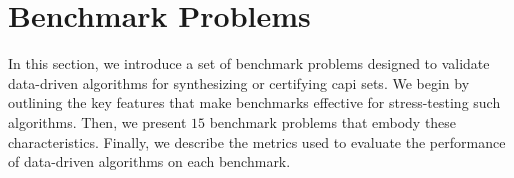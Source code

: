 \section{Benchmark Problems}
\label{sec:benchmarks}

In this section, we introduce a set of benchmark problems designed to validate data-driven algorithms for synthesizing or certifying \ac{capi} sets. We begin by outlining the key features that make benchmarks effective for stress-testing such algorithms. Then, we present $15$ benchmark problems that embody these characteristics. Finally, we describe the metrics used to evaluate the performance of data-driven algorithms on each benchmark.


